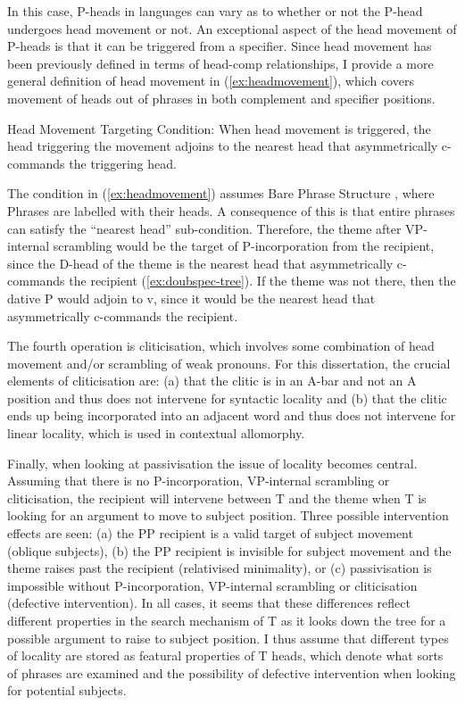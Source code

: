 \begin{exe}
 In this case, P-heads in languages can vary as to whether or not the P-head undergoes head movement or not. An exceptional aspect of the head movement of P-heads is that it can be triggered from a specifier. Since head movement has been previously defined in terms of head-comp relationships, I provide a more general definition of head movement in (\ref{ex:headmovement}), which covers movement of heads out of phrases in both complement and specifier positions.

 \begin{exe}
	 \ex Head Movement Targeting Condition: When head movement is triggered, the head triggering the movement adjoins to the nearest head that asymmetrically c-commands the triggering head. \label{ex:headmovement}
 \end{exe}

 The condition in (\ref{ex:headmovement}) assumes Bare Phrase Structure \citep{Chomsky.1993}, where Phrases are labelled with their heads. A consequence of this is that entire phrases can satisfy the ``nearest head'' sub-condition. Therefore, the theme after VP-internal scrambling would be the target of P-incorporation from the recipient, since the D-head of the theme is the nearest head that asymmetrically c-commands the recipient (\ref{ex:doubspec-tree}). If the theme was not there, then the dative P would adjoin to v, since it would be the nearest head that asymmetrically c-commands the recipient.

 The fourth operation is cliticisation, which involves some combination of head movement and/or scrambling of weak pronouns. For this dissertation, the crucial elements of cliticisation are: (a) that the clitic is in an A-bar and not an A position and thus does not intervene for syntactic locality and (b) that the clitic ends up being incorporated into an adjacent word and thus does not intervene for linear locality, which is used in contextual allomorphy.

 Finally, when looking at passivisation the issue of locality becomes central. Assuming that there is no P-incorporation, VP-internal scrambling or cliticisation, the recipient will intervene between T and the theme when T is looking for an argument to move to subject position. Three possible intervention effects are seen: (a) the PP recipient is a valid target of subject movement (oblique subjects), (b) the PP recipient is invisible for subject movement and the theme raises past the recipient (relativised minimality), or (c) passivisation is impossible without P-incorporation, VP-internal scrambling or cliticisation (defective intervention). In all cases, it seems that these differences reflect different properties in the search mechanism of T as it looks down the tree for a possible argument to raise to subject position. I thus assume that different types of locality are stored as featural properties of T heads, which denote what sorts of phrases are examined and the possibility of defective intervention when looking for potential subjects.


\end{exe}
